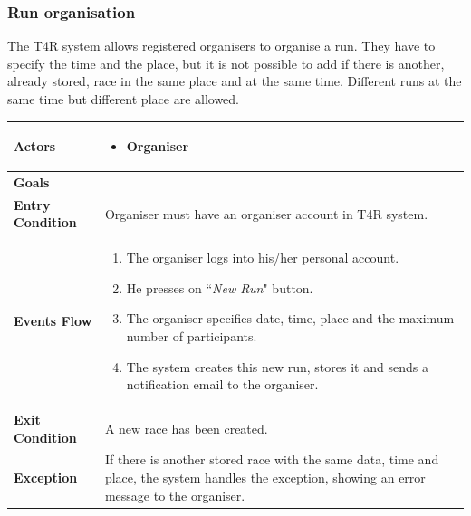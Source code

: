         \subsubsection{Run organisation}
            
            The T4R system allows registered organisers to organise a run. They have to specify the time and the place, but it is not possible to add if there is another, already stored, race in the same place and at the same time. Different runs at the same time but different place are allowed.
            
            \begin{table}[H]
            	\centering
                
                \begin{tabular}{|p{3cm}|p{8.2cm}|}
                    \hline
                    \textbf{Actors} & \begin{itemize}
                        \item Organiser
                    \end{itemize} \\
                     \hline
                    \textbf{Goals} & \\ 
                     \hline
                    \textbf{Entry Condition} & Organiser must have an organiser account in T4R system.\\
                     \hline
                    \textbf{Events Flow} & \begin{enumerate}
                                                \item The organiser logs into his/her personal account.
                                                \item He presses on ``\emph{New Run}" button.
                                                \item The organiser specifies date, time, place and the maximum number of participants.
                                                \item The system creates this new run, stores it and sends a notification email to the organiser.
                                            \end{enumerate}\\
                     \hline
                    \textbf{Exit Condition} & A new race has been created.\\
                     \hline
                    \textbf{Exception} & If there is another stored race with the same data, time and place, the system handles the exception, showing an error message to the organiser. \\
                     \hline
                \end{tabular}  
            \end{table} 
            
